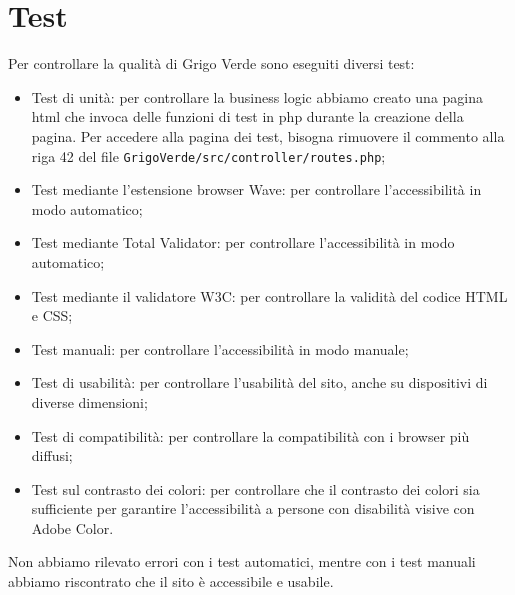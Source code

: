 \section{Test}
\label{sec:test}

Per controllare la qualità di Grigo Verde sono eseguiti diversi test:
\begin{itemize}
	\item Test di unità: per controllare la business logic abbiamo creato una
	      pagina html che invoca delle funzioni di test in php durante la
	      creazione della pagina. Per accedere alla pagina dei test, bisogna
	      rimuovere il commento alla riga 42 del file
	      \texttt{GrigoVerde/src/controller/routes.php};

	\item Test mediante l'estensione browser Wave: per controllare
	      l'accessibilità in modo automatico;

	\item Test mediante Total Validator: per controllare l'accessibilità in modo
	      automatico;

	\item Test mediante il validatore W3C: per controllare la validità del codice
	      HTML e CSS;

	\item Test manuali: per controllare l'accessibilità in modo manuale;

	\item Test di usabilità: per controllare l'usabilità del sito, anche su
	      dispositivi di diverse dimensioni;

	\item Test di compatibilità: per controllare la compatibilità con i browser
	      più diffusi;

	\item Test sul contrasto dei colori: per controllare che il contrasto dei
	      colori sia sufficiente per garantire l'accessibilità a persone con
	      disabilità visive con Adobe Color.
\end{itemize}

Non abbiamo rilevato errori con i test automatici, mentre con i test manuali
abbiamo riscontrato che il sito è accessibile e usabile.
